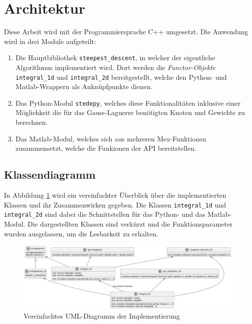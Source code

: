 \section{Architektur}

Diese Arbeit wird mit der Programmiersprache C++ umgesetzt.
Die Anwendung wird in drei Module aufgeteilt:
\begin{enumerate}
    \item Die Hauptbibliothek \texttt{steepest\_descent}, in welcher der eigentliche Algorithmus implementiert wird. Dort werden die \textit{Functor-Objekte} \texttt{integral\_1d} und \texttt{integral\_2d} bereitgestellt,
    welche den Python- und Matlab-Wrappern als Anknüpfpunkte dienen. 
    \item Das Python-Modul \texttt{stedepy}, welches diese Funktionalitäten inklusive einer Möglichkeit die für das Gauss-Laguerre benötigten Knoten und Gewichte zu berechnen.
    \item Das Matlab-Modul, welches sich aus mehreren Mex-Funktionen zusammensetzt, welche die Funkionen der API bereitstellen.
\end{enumerate}

\subsection{Klassendiagramm}

In Abbildung \ref{uml} wird ein vereinfachter Überblick über die implementierten Klassen und ihr Zusammenwirken gegeben.
Die Klassen \texttt{integral\_1d} und \texttt{integral\_2d} sind dabei die Schnittstellen für das Python- und das Matlab-Modul.
Die dargestellten Klassen sind verkürzt und die Funktionsparameter wurden ausgelassen, um die Lesbarkeit zu erhalten.

\begin{figure}
    \includegraphics[width=\textwidth]{images/uml.png}
    \caption{Vereinfachtes UML-Diagramm der Implementierung}\label{uml}
\end{figure}

